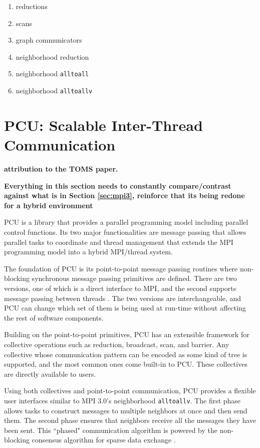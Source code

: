 \begin{enumerate}
\item reductions
\item scans
\item graph communicators
\item neighborhood reduction
\item neighborhood \texttt{alltoall}
\item neighborhood \texttt{alltoallv}
\end{enumerate}

\section{PCU: Scalable Inter-Thread Communication}
\label{sec:pcu}

{\bf attribution to the TOMS paper.}

{\bf Everything in this section needs to constantly
compare/contrast against what is in Section \ref{sec:mpi3},
reinforce that its being redone for a hybrid environment}

PCU is a library that provides a parallel programming model including
parallel control functions.
Its two major functionalities are message passing that allows parallel tasks to
coordinate and thread management that extends the MPI programming model
into a hybrid MPI/thread system.

The foundation of PCU is its point-to-point message passing routines where
non-blocking synchronous message passing primitives are defined. There are
two versions, one of which is a direct interface to MPI, and the second supports
message passing between threads \cite{ibanez2014hybrid}. The two versions
are interchangeable, and PCU can change which set of them is being used at
run-time without affecting the rest of software components.

Building on the point-to-point primitives, PCU has an extensible framework for
collective operations such as reduction, broadcast, scan, and barrier.
Any collective whose communication pattern can be encoded as some kind of tree
is supported, and the most common ones come built-in to PCU.
These collectives are directly available to users.

Using both collectives and point-to-point communication, PCU provides a flexible
user interfaces similar to MPI 3.0's neighborhood \texttt{alltoallv}.
The first phase
allows tasks to construct messages to multiple neighbors
at once and then send them.
The second phase ensures that neighbors
receive all the messages they have been sent.
This ``phased" communication algorithm is
powered by the non-blocking consensus algorithm
for sparse data exchange \cite{hoefler2010scalable}.

